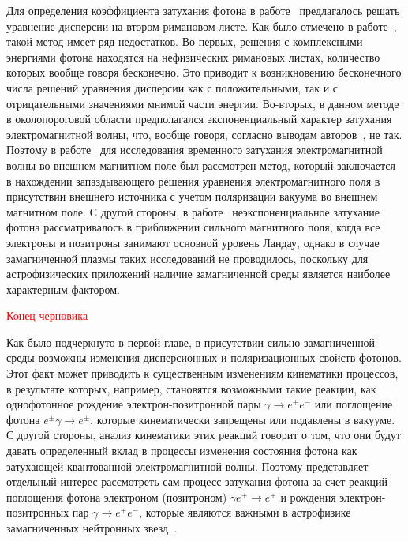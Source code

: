 Для определения коэффициента затухания фотона  в работе~\cite{Shabad:1988} предлагалось решать уравнение дисперсии на втором римановом листе.  Как было отмечено в работе~\cite{MikhChist:2001}, такой метод имеет ряд недостатков. Во-первых, решения с комплексными энергиями фотона находятся на нефизических римановых листах, количество которых вообще говоря бесконечно. Это приводит к возникновению бесконечного числа решений уравнения дисперсии как с положительными, так и с отрицательными значениями мнимой части энергии. Во-вторых, в данном методе в околопороговой области предполагался экспоненциальный характер затухания электромагнитной волны, что, вообще говоря, согласно выводам авторов~\cite{MikhChist:2001}, не так. Поэтому в работе~\cite{MikhChist:2001} для исследования временного затухания электромагнитной волны во внешнем магнитном поле был рассмотрен метод, который заключается в нахождении запаздывающего решения уравнения электромагнитного поля в присутствии внешнего источника с учетом поляризации вакуума во внешнем магнитном поле. С другой стороны, в работе~\cite{MikhChist:2001} неэкспоненциальное затухание фотона рассматривалось в приближении сильного магнитного поля, когда все электроны и позитроны занимают основной уровень Ландау, однако в случае замагниченной плазмы таких исследований не проводилось, поскольку для астрофизических приложений наличие замагниченной среды является наиболее характерным фактором.






\textcolor{red}{Конец черновика}

Как было подчеркнуто в первой главе, в присутствии сильно замагниченной среды 
возможны изменения дисперсионных и поляризационных свойств фотонов. Этот факт 
может приводить к существенным изменениям кинематики процессов, в результате 
которых, например, становятся возможными такие реакции, как однофотонное 
рождение электрон-позитронной пары $\gamma\to e^+e^-$ или поглощение фотона 
$e^{\pm}\gamma\to e^{\pm}$, которые кинематически запрещены или подавлены в 
вакууме. С другой стороны, анализ кинематики этих реакций говорит о том, что 
они будут давать определенный вклад в процессы изменения состояния фотона как 
затухающей квантованной электромагнитной волны. Поэтому представляет отдельный 
интерес рассмотреть сам процесс затухания фотона за счет реакций поглощения 
фотона электроном (позитроном)
$\gamma e^{\pm} \to e^{\pm}$ и рождения электрон-позитронных пар $\gamma \to e^+ e^-$, которые являются важными в астрофизике замагниченных нейтронных звезд~\cite{Kostenko:2018,Philippov_2020}. 

